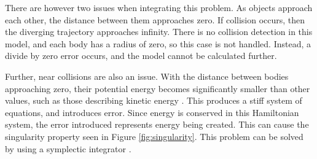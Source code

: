 \documentclass{article}
\begin{document}
There are however two issues when integrating this problem. As objects
approach each other, the distance between them approaches zero. If collision
occurs, then the diverging trajectory approaches infinity. There is
no collision detection in
this model, and each body has a radius of zero, so this case is not handled.
Instead, a divide by zero error occurs, and the model cannot be calculated
further.

Further, near collisions are also an issue. With the distance between bodies
approaching zero, their potential energy becomes significantly smaller than
other values, such as those describing kinetic energy
\cite{chambers1999hybrid}. This produces a stiff system of equations, and
introduces error. Since energy is conserved in this Hamiltonian system, the
error introduced represents energy being created. This can cause the
singularity property seen in Figure \ref{fig:singularity}. This problem can
be solved by using a symplectic integrator \cite{chambers1999hybrid}.
\end{document}
